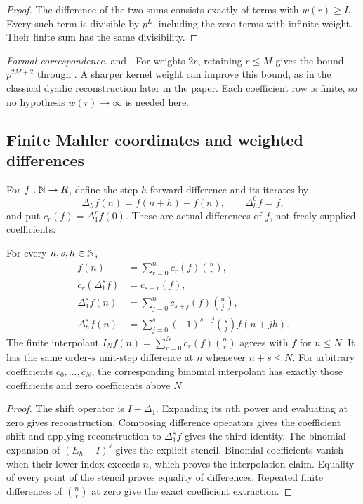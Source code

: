 \begin{proof}
The difference of the two sums consists exactly of terms with $w(r)\geq L$.
Every such term is divisible by $p^L$, including the zero terms with infinite
weight. Their finite sum has the same divisibility.
\end{proof}

\begingroup\small\raggedright
\noindent\emph{Formal correspondence.}
 and
.
For weights $2r$, retaining $r\leq M$ gives the bound $p^{2M+2}$ through
. A sharper kernel weight can improve this
bound, as in the classical dyadic reconstruction later in the paper. Each
coefficient row is finite, so no hypothesis $w(r)\to\infty$ is needed here.
\par\endgroup

\subsection{Finite Mahler coordinates and weighted differences}

For $f:\mathbb N\to R$, define the step-$h$ forward difference and its iterates by
\[
\Delta_h f(n)=f(n+h)-f(n),\qquad \Delta_h^0 f=f,
\]
and put $c_r(f)=\Delta_1^r f(0)$. These are actual differences of $f$, not
freely supplied coefficients.

\begin{theorem}
\label{thm:mahler-foundation}
For every $n,s,h\in\mathbb N$,
\[
\begin{aligned}
f(n)&=\sum_{r=0}^{n}c_r(f)\binom nr,\\
c_r(\Delta_1^s f)&=c_{s+r}(f),\\
\Delta_1^s f(n)&=\sum_{j=0}^{n}c_{s+j}(f)\binom nj,\\
\Delta_h^s f(n)&=\sum_{j=0}^{s}(-1)^{s-j}\binom sj f(n+jh).
\end{aligned}
\]
The finite interpolant
$I_Nf(n)=\sum_{r=0}^{N}c_r(f)\binom nr$ agrees with $f$ for $n\leq N$.
It has the same order-$s$ unit-step difference at $n$ whenever $n+s\leq N$.
For arbitrary coefficients $c_0,\ldots,c_N$, the corresponding binomial
interpolant has exactly those coefficients and zero coefficients above $N$.
\end{theorem}

\begin{proof}
The shift operator is $I+\Delta_1$. Expanding its $n$th power and evaluating
at zero gives reconstruction. Composing difference operators gives the
coefficient shift and applying reconstruction to $\Delta_1^s f$ gives the
third identity. The binomial expansion of $(E_h-I)^s$ gives the explicit
stencil. Binomial coefficients vanish when their lower index exceeds $n$,
which proves the interpolation claim. Equality of every point of the stencil
proves equality of differences. Repeated finite differences of $\binom nr$
at zero give the exact coefficient extraction.
\end{proof}


